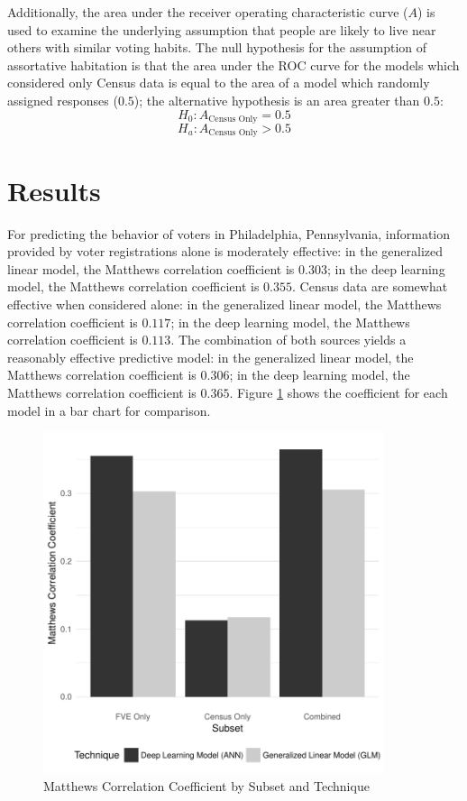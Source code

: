 \documentclass[12pt]{article}
\begin{document}
Additionally, the area under the receiver operating characteristic curve ($A$) is used to examine the underlying assumption that people are likely to live near others with similar voting habits. The null hypothesis for the assumption of assortative habitation is that the area under the ROC curve for the models which considered only Census data is equal to the area of a model which randomly assigned responses ($0.5$); the alternative hypothesis is an area greater than $0.5$:
$$H_0: A_{\text{Census Only}} = 0.5$$
$$H_a: A_{\text{Census Only}} > 0.5$$

\section{Results}

For predicting the behavior of voters in Philadelphia, Pennsylvania, information provided by voter registrations alone is moderately effective: in the generalized linear model, the Matthews correlation coefficient is $0.303$; in the deep learning model, the Matthews correlation coefficient is $0.355$. Census data are somewhat effective when considered alone: in the generalized linear model, the Matthews correlation coefficient is $0.117$; in the deep learning model, the Matthews correlation coefficient is $0.113$. The combination of both sources yields a reasonably effective predictive model: in the generalized linear model, the Matthews correlation coefficient is $0.306$; in the deep learning model, the Matthews correlation coefficient is $0.365$. Figure \ref{mcc} shows the coefficient for each model in a bar chart for comparison.

\begin{figure}
\centering \caption{Matthews Correlation Coefficient by Subset and Technique} \label{mcc}
\includegraphics[width=10cm]{Graphic001.pdf}
\end{figure}
\end{document}
